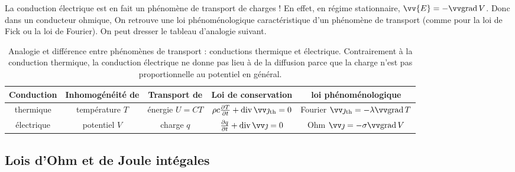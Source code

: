 \documentclass[12pt,fancy]{cours}%
\begin{document}

La conduction électrique est en fait un phénomène de transport de charges ! En effet, en régime stationnaire, $\vv{E}=-\grad{V}$. Donc dans un conducteur ohmique,
On retrouve une loi phénoménologique caractéristique d'un phénomène de transport (comme pour la loi de Fick ou la loi de Fourier). On peut dresser le tableau d'analogie suivant.

\begin{table}[h!]
\renewcommand{\arraystretch}{1.5}
\begin{tabular}{|c|c|c|c|c|}
\hline
Conduction & Inhomogénéité de & Transport de & Loi de conservation & loi phénoménologique  \\
\hline
thermique & température $T$ & énergie $U=CT$ & $\rho c \dr{T}{t} + \dive{\Vec{\jth}} = 0$ & Fourier $\Vec{\jth} = -\lambda \grad T$ \\
\hline
électrique & potentiel $V$ & charge $q$ & $\dr{q}{t} + \dive{\Vec{\jmath}} = 0$ & Ohm $\Vec{\jmath} = -\sigma \grad V$ \\
\hline
\end{tabular}
\caption{Analogie et différence entre phénomènes de transport : conductions thermique et électrique. Contrairement à la conduction thermique, la conduction électrique ne donne pas lieu à de la diffusion parce que la charge n'est pas proportionnelle au potentiel en général.}
\end{table}

\subsection{Lois d'Ohm et de Joule intégales}
\end{document}
